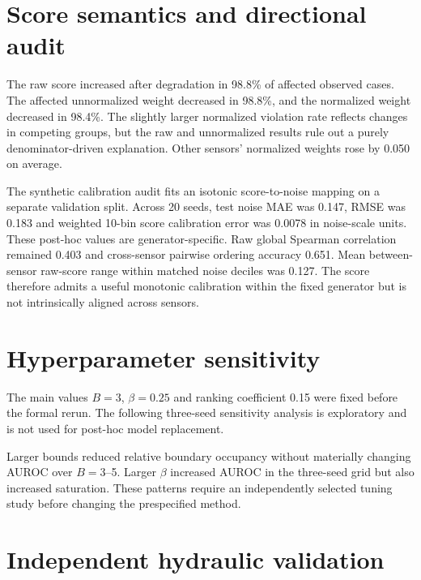 \documentclass[10pt]{article}
\begin{document}
\section{Score semantics and directional audit}

The raw score increased after degradation in 98.8\% of affected observed cases. The affected unnormalized weight decreased in 98.8\%, and the normalized weight decreased in 98.4\%. The slightly larger normalized violation rate reflects changes in competing groups, but the raw and unnormalized results rule out a purely denominator-driven explanation. Other sensors' normalized weights rose by 0.050 on average.

The synthetic calibration audit fits an isotonic score-to-noise mapping on a separate validation split. Across 20 seeds, test noise MAE was 0.147, RMSE was 0.183 and weighted 10-bin score calibration error was 0.0078 in noise-scale units. These post-hoc values are generator-specific. Raw global Spearman correlation remained 0.403 and cross-sensor pairwise ordering accuracy 0.651. Mean between-sensor raw-score range within matched noise deciles was 0.127. The score therefore admits a useful monotonic calibration within the fixed generator but is not intrinsically aligned across sensors.

\section{Hyperparameter sensitivity}

The main values $B=3$, $\beta=0.25$ and ranking coefficient 0.15 were fixed before the formal rerun. The following three-seed sensitivity analysis is exploratory and is not used for post-hoc model replacement.

\begin{table}[ht]
\centering
\caption{Bound, weighting-strength and ranking-weight sensitivity. Saturation denotes the affected fraction with $|r|\geq0.95B$.}
\resizebox{0.70\textwidth}{!}{}
\end{table}

Larger bounds reduced relative boundary occupancy without materially changing AUROC over $B=3$--5. Larger $\beta$ increased AUROC in the three-seed grid but also increased saturation. These patterns require an independently selected tuning study before changing the prespecified method.

\section{Independent hydraulic validation}
\end{document}
